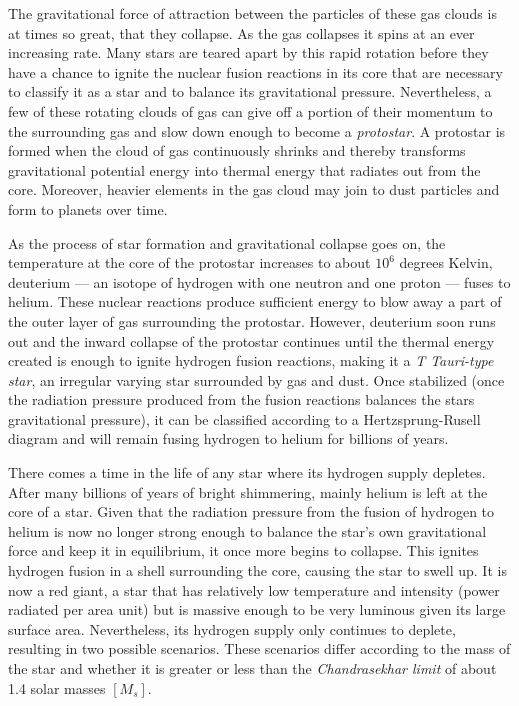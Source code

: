 The gravitational force of attraction between the particles of these gas clouds is at times so great, that they collapse. As the gas collapses it spins at an ever increasing rate. Many stars are teared apart by this rapid rotation before they have a chance to ignite the nuclear fusion reactions in its core that are necessary to classify it as a star and to balance its gravitational pressure. Nevertheless, a few of these rotating clouds of gas can give off a portion of their momentum to the surrounding gas and slow down enough to become a \emph{protostar}. A protostar is formed when the cloud of gas continuously shrinks and thereby transforms gravitational potential energy into thermal energy that radiates out from the core. Moreover, heavier elements in the gas cloud may join to dust particles and form to planets over time.


As the process of star formation and gravitational collapse goes on, the temperature at the core of the protostar increases to about $10^6$ degrees Kelvin, deuterium --- an isotope of hydrogen with one neutron and one proton --- fuses to helium. These nuclear reactions produce sufficient energy to blow away a part of the outer layer of gas surrounding the protostar. However, deuterium soon runs out and the inward collapse of the protostar continues until the thermal energy created is enough to ignite hydrogen fusion reactions, making it a \emph{T Tauri-type star}, an irregular varying star surrounded by gas and dust. Once stabilized (once the radiation pressure produced from the fusion reactions balances the stars gravitational pressure), it can be classified according to a Hertzsprung-Rusell diagram and will remain fusing hydrogen to helium for billions of years.


There comes a time in the life of any star where its hydrogen supply depletes. After many billions of years of bright shimmering, mainly helium is left at the core of a star. Given that the radiation pressure from the fusion of hydrogen to helium is now no longer strong enough to balance the star's own gravitational force and keep it in equilibrium, it once more begins to collapse. This ignites hydrogen fusion in a shell surrounding the core, causing the star to swell up. It is now a red giant, a star that has relatively low temperature and intensity (power radiated per area unit) but is massive enough to be very luminous given its large surface area. Nevertheless, its hydrogen supply only continues to deplete, resulting in two possible scenarios. These scenarios differ according to the mass of the star and whether it is greater or less than the \emph{Chandrasekhar limit} of about 1.4 solar masses $[M_s]$.


